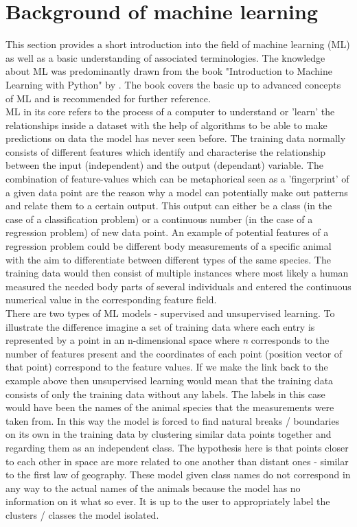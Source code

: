 \section{Background of machine learning}
This section provides a short introduction into the field of machine learning (ML) as well as a basic understanding of associated terminologies. The knowledge about ML was predominantly drawn from the book "Introduction to Machine Learning with Python" by \textcite{Guido2016}. The book covers the basic up to advanced concepts of ML and is recommended for further reference.\\
ML in its core refers to the process of a computer to understand or 'learn' the relationships inside a dataset with the help of algorithms to be able to make predictions on data the model has never seen before.
The training data normally consists of different features which identify and characterise the relationship between the input (independent) and the output (dependant) variable. The combination of feature-values which can be metaphorical seen as a 'fingerprint' of a given data point are the reason why a model can potentially make out patterns and relate them to a certain output. This output can either be a class (in the case of a classification problem) or a continuous number (in the case of a regression problem) of new data point.
An example of potential features of a regression problem could be different body measurements of a specific animal with the aim to differentiate between different types of the same species. The training data would then consist of multiple instances where most likely a human measured the needed body parts of several individuals and entered the continuous numerical value in the corresponding feature field.\\
\newline
There are two types of ML models - supervised and unsupervised learning. To illustrate the difference imagine a set of training data where each entry is represented by a point in an n-dimensional space where \textit{n} corresponds to the number of features present and the coordinates of each point (position vector of that point) correspond to the feature values. If we make the link back to the example above then unsupervised learning would mean that the training data consists of only the training data without any labels. The labels in this case would have been the names of the animal species that the measurements were taken from. In this way the model is forced to find natural breaks / boundaries on its own in the training data by clustering similar data points together and regarding them as an independent class. The hypothesis here is that points closer to each other in space are more related to one another than distant ones - similar to the first law of geography. These model given class names do not correspond in any way to the actual names of the animals because the model has no information on it what so ever. It is up to the user to appropriately label the clusters / classes the model isolated.

